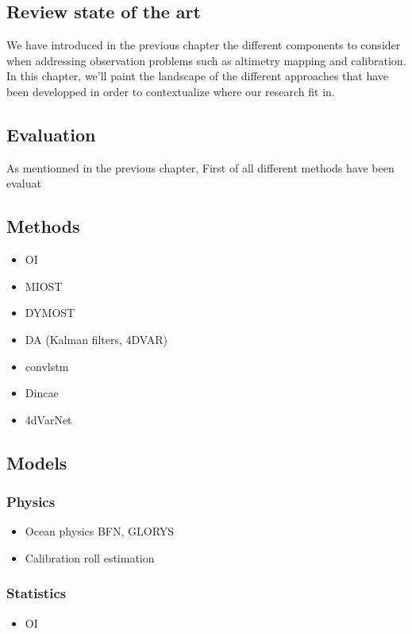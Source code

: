 \begin{bibunit}

\chapter*{Review state of the art}
We have introduced in the previous chapter the different components to consider when addressing observation problems such as altimetry mapping and calibration. In this chapter, we'll paint the landscape of the different approaches that have been developped in order to contextualize where our research fit in.


  \section{Evaluation}
  As mentionned in the previous chapter, 
  First of all different methods have been evaluat
  \section{Methods}

  \begin{itemize}
    \item OI
    \item MIOST
    \item DYMOST
    \item DA (Kalman filters, 4DVAR)
    \item convlstm
    \item Dincae
    \item 4dVarNet
  \end{itemize}
\section{Models}
  \subsection{Physics}
  \begin{itemize}
    \item Ocean physics BFN, GLORYS 
    \item Calibration roll estimation
  \end{itemize}
  \subsection{Statistics}
  \begin{itemize}
    \item OI
  \end{itemize}

\end{bibunit}
